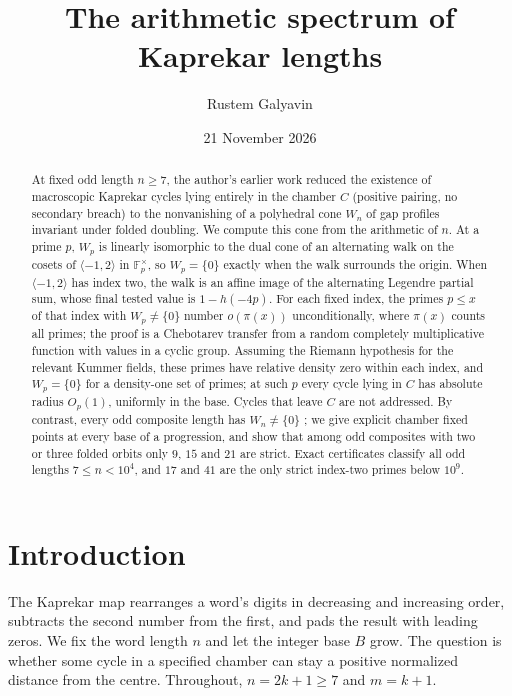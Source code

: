 \documentclass[11pt,reqno]{amsart}
\title[The arithmetic spectrum of Kaprekar lengths]{The arithmetic spectrum of Kaprekar lengths}
\author{Rustem Galyavin}
\date{21 November 2026}
\newcommand{\F}{\mathbb F}
\begin{document}
\raggedbottom
\begin{abstract}
At fixed odd length \(n\ge7\), the author's earlier work \cite{G10} reduced the existence of macroscopic Kaprekar cycles lying entirely in the chamber \(C\) (positive pairing, no secondary breach) to the nonvanishing of a polyhedral cone \(W_n\) of gap profiles invariant under folded doubling. We compute this cone from the arithmetic of \(n\). At a prime \(p\), \(W_p\) is linearly isomorphic to the dual cone of an alternating walk on the cosets of \(\langle-1,2\rangle\) in \(\F_p^\times\), so \(W_p=\{0\}\) exactly when the walk surrounds the origin. When \(\langle-1,2\rangle\) has index two, the walk is an affine image of the alternating Legendre partial sum, whose final tested value is \(1-h(-4p)\). For each fixed index, the primes \(p\le x\) of that index with \(W_p\ne\{0\}\) number \(o(\pi(x))\) unconditionally, where \(\pi(x)\) counts all primes; the proof is a Chebotarev transfer from a random completely multiplicative function with values in a cyclic group. Assuming the Riemann hypothesis for the relevant Kummer fields, these primes have relative density zero within each index, and \(W_p=\{0\}\) for a density-one set of primes; at such \(p\) every cycle lying in \(C\) has absolute radius \(O_p(1)\), uniformly in the base. Cycles that leave \(C\) are not addressed. By contrast, every odd composite length has \(W_n\ne\{0\}\) \cite{G10}; we give explicit chamber fixed points at every base of a progression, and show that among odd composites with two or three folded orbits only \(9\), \(15\) and \(21\) are strict. Exact certificates classify all odd lengths \(7\le n<10^4\), and \(17\) and \(41\) are the only strict index-two primes below \(10^9\).
\end{abstract}
\maketitle

\section{Introduction}
The Kaprekar map rearranges a word's digits in decreasing and increasing order, subtracts the second number from the first, and pads the result with leading zeros. We fix the word length \(n\) and let the integer base \(B\) grow. The question is whether some cycle in a specified chamber can stay a positive normalized distance from the centre. Throughout, \(n=2k+1\ge7\) and \(m=k+1\).
\end{document}
